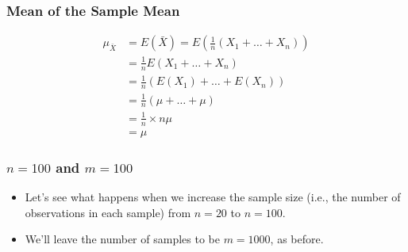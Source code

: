 \documentclass[12pt]{beamer}
\begin{document}
\begin{frame}
	\frametitle{Mean of the Sample Mean}
	
	\begin{align*}
		\mu_{\bar{X}} &= E(\bar{X}) = E\left(\frac{1}{n}(X_1 + \ldots + X_n)\right) \\
		&= \frac{1}{n}E(X_1 + \ldots + X_n) \\
		&= \frac{1}{n}(E(X_1) + \ldots + E(X_n)) \\
		&= \frac{1}{n}(\mu + \ldots + \mu) \\
		&= \frac{1}{n} \times n\mu \\
		&= \mu
	\end{align*}
	
\end{frame}
\begin{frame}
	\frametitle{$n=100$ and $m=100$}
	
	\begin{itemize}[label={\color{blue}$\blacktriangleright$}]
		\item Let's see what happens when we increase the sample size (i.e., the number of observations in each sample) from $n=20$ to $n=100$.
		
		\item We'll leave the number of samples to be $m = 1000$, as before.

	\end{itemize}
	
\end{frame}
\end{document}
